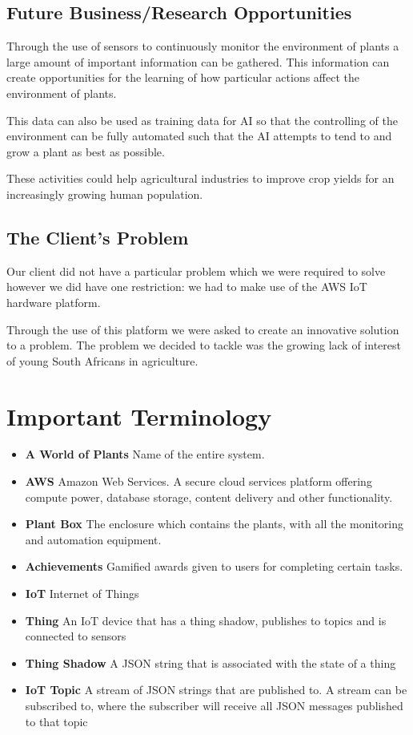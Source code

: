 \documentclass{article}
\begin{document}
\subsection{Future Business/Research Opportunities}
	Through the use of sensors to continuously monitor the environment of plants a large amount of important information can be gathered. This information can create opportunities for the learning of how particular actions affect the environment of plants.
	
	This data can also be used as training data for AI so that the controlling of the environment can be fully automated such that the AI attempts to tend to and grow a plant as best as possible.
	
	These activities could help agricultural industries to improve crop yields for an increasingly growing human population.

\subsection{The Client's Problem}
	Our client did not have a particular problem which we were required to solve however we did have one restriction: we had to make use of the AWS IoT hardware platform.
	
	Through the use of this platform we were asked to create an innovative solution to a problem. The problem we decided to tackle was the growing lack of interest of young South Africans in agriculture.
	
\section{Important Terminology}
\begin{itemize}
	\item \textbf{A World of Plants} Name of the entire system.
	\item \textbf{AWS} Amazon Web Services. A secure cloud services platform offering compute power, database storage, content delivery and other functionality.
	\item \textbf{Plant Box} The enclosure which contains the plants, with all the monitoring and automation equipment.
	\item \textbf{Achievements} Gamified awards given to users for completing certain tasks.
	\item \textbf{IoT} Internet of Things
	\item \textbf{Thing} An IoT device that has a thing shadow, publishes to topics and is connected to sensors
	\item \textbf{Thing Shadow} A JSON string that is associated with the state of a thing
	\item \textbf{IoT Topic} A stream of JSON strings that are published to. A stream can be subscribed to, where the subscriber will receive all JSON messages published to that topic
\end{itemize}
\end{document}
